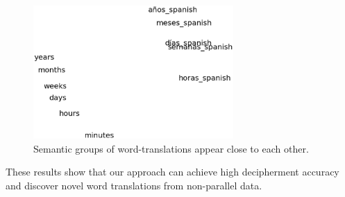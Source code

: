  \begin{figure}[!ht]
  \centering
  \includegraphics[width=3.0in,height=2.0in]{time}
  \caption{Semantic groups of word-translations appear close to each other.}
\label{fig:trans-cluster}
\end{figure}


These results show that our approach can achieve high decipherment accuracy and discover novel word translations from non-parallel data. 

